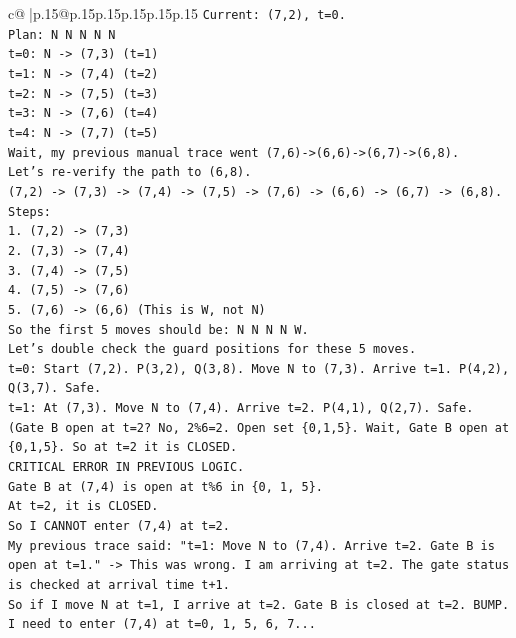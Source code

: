 \documentclass{article}
\begin{document}
{\begin{supertabular}{c@{$\;$}|p{.15\linewidth}@{}p{.15\linewidth}p{.15\linewidth}p{.15\linewidth}p{.15\linewidth}p{.15\linewidth}}
{{{\texttt{Current: (7,2), t=0.} \\
\texttt{Plan: N N N N N} \\
\texttt{t=0: N {-}> (7,3) (t=1)} \\
\texttt{t=1: N {-}> (7,4) (t=2)} \\
\texttt{t=2: N {-}> (7,5) (t=3)} \\
\texttt{t=3: N {-}> (7,6) (t=4)} \\
\texttt{t=4: N {-}> (7,7) (t=5)} \\
\texttt{Wait, my previous manual trace went (7,6){-}>(6,6){-}>(6,7){-}>(6,8).} \\
\texttt{Let's re{-}verify the path to (6,8).} \\
\texttt{(7,2) {-}> (7,3) {-}> (7,4) {-}> (7,5) {-}> (7,6) {-}> (6,6) {-}> (6,7) {-}> (6,8).} \\
\texttt{Steps:} \\
\texttt{1. (7,2) {-}> (7,3)} \\
\texttt{2. (7,3) {-}> (7,4)} \\
\texttt{3. (7,4) {-}> (7,5)} \\
\texttt{4. (7,5) {-}> (7,6)} \\
\texttt{5. (7,6) {-}> (6,6) (This is W, not N)} \\
\texttt{So the first 5 moves should be: N N N N W.} \\
\texttt{Let's double check the guard positions for these 5 moves.} \\
\texttt{t=0: Start (7,2). P(3,2), Q(3,8). Move N to (7,3). Arrive t=1. P(4,2), Q(3,7). Safe.} \\
\texttt{t=1: At (7,3). Move N to (7,4). Arrive t=2. P(4,1), Q(2,7). Safe. (Gate B open at t=2? No, 2\%6=2. Open set \{0,1,5\}. Wait, Gate B open at \{0,1,5\}. So at t=2 it is CLOSED.} \\
\texttt{CRITICAL ERROR IN PREVIOUS LOGIC.} \\
\texttt{Gate B at (7,4) is open at t\%6 in \{0, 1, 5\}.} \\
\texttt{At t=2, it is CLOSED.} \\
\texttt{So I CANNOT enter (7,4) at t=2.} \\
\texttt{My previous trace said: "t=1: Move N to (7,4). Arrive t=2. Gate B is open at t=1." {-}> This was wrong. I am arriving at t=2. The gate status is checked at arrival time t+1.} \\
\texttt{So if I move N at t=1, I arrive at t=2. Gate B is closed at t=2. BUMP.} \\
\texttt{I need to enter (7,4) at t=0, 1, 5, 6, 7...} \\
}}}
\end{supertabular}}
\end{document}
